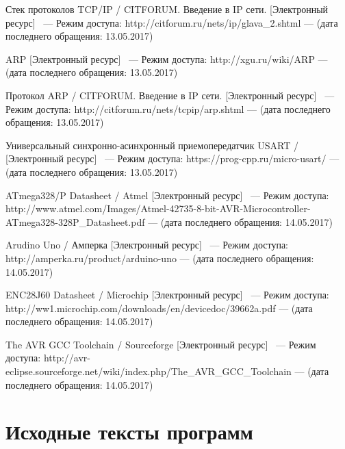 \documentclass[utf8x,14pt, coursreport]{G7-32}
\begin{document}
\begin{thebibliography}{99}
 Стек протоколов TCP/IP / CITFORUM. Введение в IP сети. [Электронный ресурс] ~--- Режим доступа: http://citforum.ru/nets/ip/glava\_2.shtml --- (дата последнего обращения: 13.05.2017)

 ARP [Электронный ресурс] ~--- Режим доступа: http://xgu.ru/wiki/ARP --- (дата последнего обращения: 13.05.2017)

  Протокол ARP  / CITFORUM. Введение в IP сети. [Электронный ресурс] ~--- Режим доступа: http://citforum.ru/nets/tcpip/arp.shtml --- (дата последнего обращения: 13.05.2017)

 Универсальный синхронно-асинхронный приемопередатчик USART / [Электронный ресурс] ~--- Режим доступа: https://prog-cpp.ru/micro-usart/ --- (дата последнего обращения: 13.05.2017)

 ATmega328/P Datasheet / Atmel [Электронный ресурс] ~--- Режим доступа: http://www.atmel.com/Images/Atmel-42735-8-bit-AVR-Microcontroller-ATmega328-328P\_Datasheet.pdf --- (дата последнего обращения: 14.05.2017)

 Arudino Uno / Амперка [Электронный ресурс] ~--- Режим доступа: http://amperka.ru/product/arduino-uno --- (дата последнего обращения: 14.05.2017)

 ENC28J60 Datasheet / Microchip  [Электронный ресурс] ~--- Режим доступа: http://ww1.microchip.com/downloads/en/devicedoc/39662a.pdf --- (дата последнего обращения: 14.05.2017)

 The AVR GCC Toolchain / Sourceforge [Электронный ресурс] ~--- Режим доступа: http://avr-eclipse.sourceforge.net/wiki/index.php/The\_AVR\_GCC\_Toolchain --- (дата последнего обращения: 14.05.2017)

\end{thebibliography}


\appendix

\chapter{Исходные тексты программ}

\small{}

\end{document}
